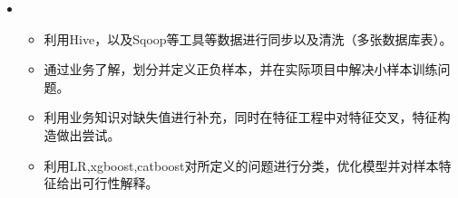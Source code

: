 \begin{itemize}[leftmargin=*]
{\begin{itemize}
            \end{itemize}

             }
       \item
           {\small
      \begin{itemize}
      \item 利用Hive，以及Sqoop等工具等数据进行同步以及清洗（多张数据库表）。
         \item 通过业务了解，划分并定义正负样本，并在实际项目中解决小样本训练问题。
          \item 利用业务知识对缺失值进行补充，同时在特征工程中对特征交叉，特征构造做出尝试。
           \item 利用LR,xgboost,catboost对所定义的问题进行分类，优化模型并对样本特征给出可行性解释。
            \end{itemize}

             }
  \end{itemize}


















